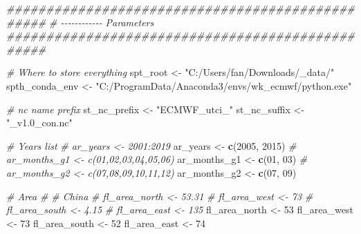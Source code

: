 \documentclass[
]{book}
\newenvironment{Shaded}{\begin{snugshade}}{\end{snugshade}}
\newcommand{\CommentTok}[1]{\textcolor[rgb]{0.56,0.35,0.01}{\textit{#1}}}
\newcommand{\DecValTok}[1]{\textcolor[rgb]{0.00,0.00,0.81}{#1}}
\newcommand{\KeywordTok}[1]{\textcolor[rgb]{0.13,0.29,0.53}{\textbf{#1}}}
\newcommand{\NormalTok}[1]{#1}
\newcommand{\StringTok}[1]{\textcolor[rgb]{0.31,0.60,0.02}{#1}}
\begin{document}
\begin{Shaded}
\begin{Highlighting}[]
\CommentTok{\#\#\#\#\#\#\#\#\#\#\#\#\#\#\#\#\#\#\#\#\#\#\#\#\#\#\#\#\#\#\#\#\#\#\#\#\#\#\#\#\#\#\#\#\#\#\#\#\#}
\CommentTok{\# {-}{-}{-}{-}{-}{-}{-}{-}{-}{-}{-}{-} Parameters}
\CommentTok{\#\#\#\#\#\#\#\#\#\#\#\#\#\#\#\#\#\#\#\#\#\#\#\#\#\#\#\#\#\#\#\#\#\#\#\#\#\#\#\#\#\#\#\#\#\#\#\#\#}

\CommentTok{\# Where to store everything}
\NormalTok{spt\_root \textless{}{-}}\StringTok{ "C:/Users/fan/Downloads/\_data/"}
\NormalTok{spth\_conda\_env \textless{}{-}}\StringTok{ "C:/ProgramData/Anaconda3/envs/wk\_ecmwf/python.exe"}

\CommentTok{\# nc name prefix}
\NormalTok{st\_nc\_prefix \textless{}{-}}\StringTok{ "ECMWF\_utci\_"}
\NormalTok{st\_nc\_suffix \textless{}{-}}\StringTok{ "\_v1.0\_con.nc"}

\CommentTok{\# Years list}
\CommentTok{\# ar\_years \textless{}{-} 2001:2019}
\NormalTok{ar\_years \textless{}{-}}\StringTok{ }\KeywordTok{c}\NormalTok{(}\DecValTok{2005}\NormalTok{, }\DecValTok{2015}\NormalTok{)}
\CommentTok{\# ar\_months\_g1 \textless{}{-} c(\textquotesingle{}01\textquotesingle{},\textquotesingle{}02\textquotesingle{},\textquotesingle{}03\textquotesingle{},\textquotesingle{}04\textquotesingle{},\textquotesingle{}05\textquotesingle{},\textquotesingle{}06\textquotesingle{})}
\NormalTok{ar\_months\_g1 \textless{}{-}}\StringTok{ }\KeywordTok{c}\NormalTok{(}\StringTok{\textquotesingle{}01\textquotesingle{}}\NormalTok{, }\StringTok{\textquotesingle{}03\textquotesingle{}}\NormalTok{)}
\CommentTok{\# ar\_months\_g2 \textless{}{-} c(\textquotesingle{}07\textquotesingle{},\textquotesingle{}08\textquotesingle{},\textquotesingle{}09\textquotesingle{},\textquotesingle{}10\textquotesingle{},\textquotesingle{}11\textquotesingle{},\textquotesingle{}12\textquotesingle{})}
\NormalTok{ar\_months\_g2 \textless{}{-}}\StringTok{ }\KeywordTok{c}\NormalTok{(}\StringTok{\textquotesingle{}07\textquotesingle{}}\NormalTok{, }\StringTok{\textquotesingle{}09\textquotesingle{}}\NormalTok{)}

\CommentTok{\# Area}
\CommentTok{\# \# China}
\CommentTok{\# fl\_area\_north \textless{}{-} 53.31}
\CommentTok{\# fl\_area\_west \textless{}{-} 73}
\CommentTok{\# fl\_area\_south \textless{}{-} 4.15}
\CommentTok{\# fl\_area\_east \textless{}{-} 135}
\NormalTok{fl\_area\_north \textless{}{-}}\StringTok{ }\DecValTok{53}
\NormalTok{fl\_area\_west \textless{}{-}}\StringTok{ }\DecValTok{73}
\NormalTok{fl\_area\_south \textless{}{-}}\StringTok{ }\DecValTok{52}
\NormalTok{fl\_area\_east \textless{}{-}}\StringTok{ }\DecValTok{74}


\end{Highlighting}
\end{Shaded}
\end{document}
